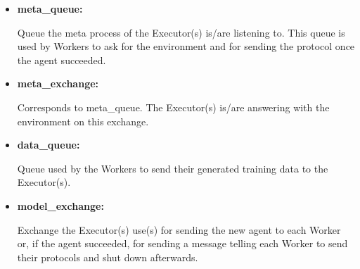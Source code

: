 \begin{itemize}[label={}]

  \item \textbf{meta\_queue:}

        Queue the meta process of the Executor(s) is/are
        listening to. This queue is used by Workers to
        ask for the environment and for sending the
        protocol once the agent succeeded.

  \item \textbf{meta\_exchange:}

        Corresponds to meta\_queue. The Executor(s) is/are
        answering with the environment on this exchange.

  \item \textbf{data\_queue:}

        Queue used by the Workers to send their generated
        training data to the Executor(s).

  \item \textbf{model\_exchange:}

        Exchange the Executor(s) use(s) for sending the new
        agent to each Worker or, if the agent succeeded,
        for sending a message telling each Worker to send
        their protocols and shut down afterwards.

\end{itemize}

